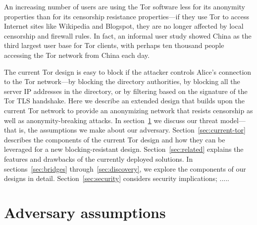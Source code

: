 \documentclass{llncs}
\begin{document}
An increasing number of users are using the Tor software
less for its anonymity properties than for its censorship
resistance properties---if they use Tor to access Internet sites like
Wikipedia
and Blogspot, they are no longer affected by local censorship
and firewall rules. In fact, an informal user study
showed China as the third largest user base
for Tor clients, with perhaps ten thousand people accessing the Tor
network from China each day.

The current Tor design is easy to block if the attacker controls Alice's
connection to the Tor network---by blocking the directory authorities,
by blocking all the server IP addresses in the directory, or by filtering
based on the signature of the Tor TLS handshake. Here we describe an
extended design that builds upon the current Tor network to provide an
anonymizing
network that resists censorship as well as anonymity-breaking attacks.
In section~\ref{sec:adversary} we discuss our threat model---that is,
the assumptions we make about our adversary. Section~\ref{sec:current-tor}
describes the components of the current Tor design and how they can be
leveraged for a new blocking-resistant design. Section~\ref{sec:related}
explains the features and drawbacks of the currently deployed solutions.
In sections~\ref{sec:bridges} through~\ref{sec:discovery}, we explore the
components of our designs in detail.  Section~\ref{sec:security} considers
security implications; ..... %





\section{Adversary assumptions}
\label{sec:adversary}
\end{document}
